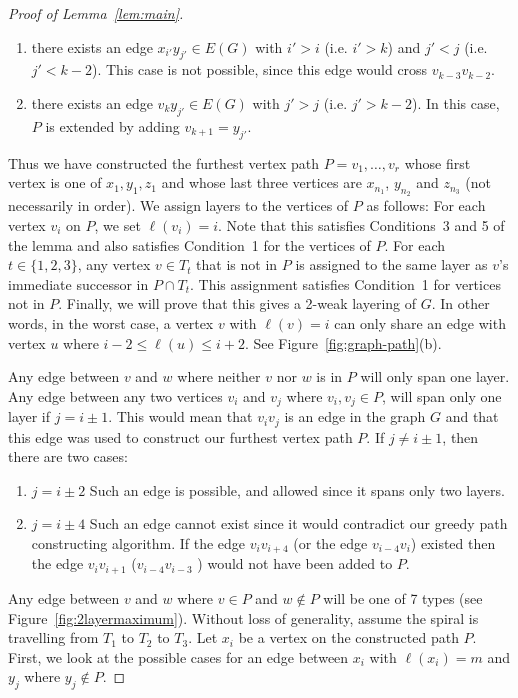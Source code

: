 \documentclass{jgaa-art}
\newcommand{\figref}[1]{\mbox{Figure~\ref{fig:#1}}}
\newcommand{\lemref}[1]{Lemma~\ref{lem:#1}}
\begin{document}
\begin{proof}[Proof of \lemref{main}]
\begin{enumerate}
  \item there exists an edge $x_{i'}y_{j'}\in E(G)$ with $i' > i$
    (i.e. $i' > k$) and $j'< j$ (i.e. $j'< k-2$).  This case is not possible, since this edge would cross $v_{k-3}v_{k-2}$.

  \item there exists an edge $v_k y_{j'}\in E(G)$ with $j' >j$  (i.e. $j'> k-2$).  In this case, $P$ is extended by adding $v_{k+1}=y_{j'}$.
  \end{enumerate}


  Thus we have constructed the furthest vertex path $P=v_1,\ldots,v_r$ whose first vertex is one of
  $x_1,y_1,z_1$ and whose last three vertices are $x_{n_1}$,
  $y_{n_2}$ and $z_{n_3}$ (not necessarily in order).  We assign layers
  to the vertices of $P$ as follows: For each vertex $v_i$ on $P$,
  we set $\ell(v_i)=i$.  Note that this satisfies Conditions~3 and 5
  of the lemma and also satisfies Condition~1 for the vertices of $P$.
  For each $t\in\{1,2,3\}$, any vertex $v\in T_t$ that is not in
  $P$ is assigned to the same layer as $v$'s immediate successor in $P\cap T_t$.
  This assignment satisfies Condition~1 for vertices not in $P$.
  Finally, we will prove that this gives a 2-weak layering of $G$. In other words,
  in the worst case, a vertex $v$ with $\ell(v)=i$ can only share an edge with vertex $u$ where  $i-2 \le \ell(u) \le i+2$.  See \figref{graph-path}(b).

 Any edge between $v$ and $w$ where neither $v$ nor $w$ is in $P$ will only span one layer.
 Any edge between any two vertices $v_i$ and $v_j$ where $v_i, v_j \in P$, will span only one layer if $j = i\pm1$.
 This would mean that $v_{i}v_{j}$ is an edge in the graph $G$
 and that this edge was used to construct our furthest vertex path $P$.
 If $j \neq i\pm1$, then there are two cases:
   \begin{enumerate}
	\item $j = i \pm 2$ Such an edge is possible, and allowed since it spans only two layers. %
	\item $j = i \pm 4$ Such an edge cannot exist since it would contradict our greedy path constructing algorithm.
	If the edge $v_iv_{i+4}$ (or the edge $v_{i-4}v_i$) existed then the edge $v_i v_{i+1}$ ($v_{i-4}v_{i-3}$ ) would not have been added to $P$.
   \end{enumerate}

 Any edge between $v$ and $w$ where $v \in P$ and $w \not\in P$ will be one of 7 types (see \figref{2layermaximum}).
 Without loss of generality, assume the spiral is travelling from $T_1$ to $T_2$ to $T_3$. Let $x_i$ be a vertex on the constructed path $P$.
 First, we look at the possible cases for an edge between $x_i$ with $\ell(x_i) = m$ and $y_j$ where $y_j \notin P$.



\end{proof}
\end{document}
